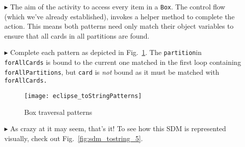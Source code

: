 \begin{itemize}
\item[$\blacktriangleright$] The aim of the activity to access every item in a \texttt{Box}. The control flow (which we've already established), invokes a
helper method to complete the action. This means both patterns need only match their object variables to ensure that all cards in all partitions are found.

\item[$\blacktriangleright$] Complete each pattern as depicted in Fig.~\ref{fig:toStringPatterns}. The \texttt{partition}in \texttt{forAllCards} is bound to
the current one matched in the first loop containing \texttt{forAllPartitions}, but \texttt{card} is \emph{not} bound as it must be matched with
\texttt{forAllCards.}

\vspace{0.5cm}

\begin{figure}[htp]
\begin{center}
  \texttt{[image: eclipse\_toStringPatterns]}
  \caption{Box traversal patterns}
  \label{fig:toStringPatterns}
\end{center}
\end{figure}

\vspace{0.5cm}

\item[$\blacktriangleright$] As crazy at it may seem, that's it!  To see how this SDM is represented visually, check out Fig.~\ref{fig:sdm_tostring_5}.

\end{itemize}
